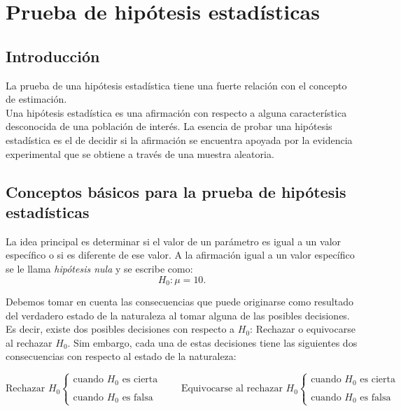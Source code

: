 \chapter{Prueba de hipótesis estadísticas}

\section{Introducción}
La prueba de una hipótesis estadística tiene una fuerte relación con el concepto de estimación.\\

Una hipótesis estadística es una afirmación con respecto a alguna característica desconocida de una población de interés. La esencia de probar una hipótesis estadística es el de decidir si la afirmación se encuentra apoyada por la evidencia experimental que se obtiene a través de una muestra aleatoria.   


\section{Conceptos básicos para la prueba de hipótesis estadísticas}
La idea principal es determinar si el valor de un parámetro es igual a un valor específico o si es diferente de ese valor. A la afirmación igual a un valor específico se le llama \textit{hipótesis nula} y se escribe como:
$$H_0:\mu=10.$$

Debemos tomar en cuenta las consecuencias que puede originarse como resultado del verdadero estado de la naturaleza al tomar alguna de las posibles decisiones. Es decir, existe dos posibles decisiones con respecto a $H_0$: Rechazar o equivocarse al rechazar $H_0$. Sim embargo, cada una de estas decisiones tiene las siguientes dos consecuencias con respecto al estado de la naturaleza:

$$
\mbox{Rechazar } H_0 \left\{
    \begin{array}{l}
	\mbox{cuando } H_0 \mbox{ es cierta}\\\\
	\mbox{cuando } H_0 \mbox{ es falsa}
    \end{array}
    \right.
\qquad
\mbox{Equivocarse al rechazar } H_0\left\{
    \begin{array}{l}
	\mbox{cuando } H_0 \mbox{ es cierta}\\\\
	\mbox{cuando } H_0 \mbox{ es falsa}
    \end{array}
\right.
$$

